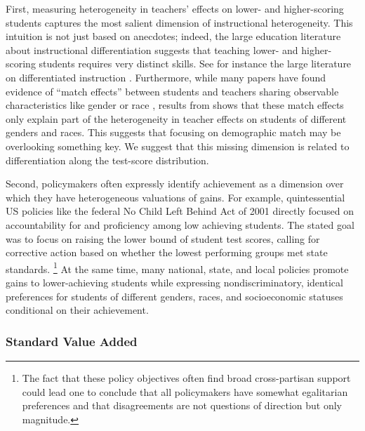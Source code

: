 \documentclass[12pt]{article}
\theoremstyle{definition}
\theoremstyle{definition}
\theoremstyle{definition}
\theoremstyle{definition}
\begin{document}
First, measuring heterogeneity in teachers' effects on lower- and higher-scoring students captures the most salient dimension of instructional heterogeneity. This intuition is not just based on anecdotes; indeed, the large education literature about instructional differentiation suggests that teaching lower- and higher-scoring students requires very distinct skills. See for instance the large literature on differentiated instruction \citep[Examples from math include][]{XXXXX JB TO ADD XXXX}. Furthermore, while many papers have found evidence of ``match effects'' between students and teachers sharing  observable characteristics like gender or race \citep{dee2005teacher,delhommer2019highschool}, results from \citet{Delgado2020} shows that these match effects only explain part of the heterogeneity in teacher effects on students of different genders and races. This suggests that focusing on demographic match may be overlooking something key. We suggest that this missing dimension is related to differentiation along the test-score distribution.

Second, policymakers often expressly identify achievement as a dimension over which they have heterogeneous valuations of gains. For example, quintessential US policies like the federal No Child Left Behind Act of 2001 directly focused on accountability for and proficiency among low achieving students. The stated goal was to focus on raising the lower bound of student test scores, calling for corrective action based on whether the lowest performing groups met state standards. \footnote{The fact that these policy objectives often find broad cross-partisan support could lead one to conclude that all policymakers have somewhat egalitarian preferences and that disagreements are not questions of direction but only magnitude.} At the same time, many national, state, and local policies promote gains to lower-achieving students while expressing nondiscriminatory, identical preferences for students of different genders, races, and socioeconomic statuses conditional on their achievement. 

\subsubsection{Standard Value Added} \label{va_std}
\end{document}
